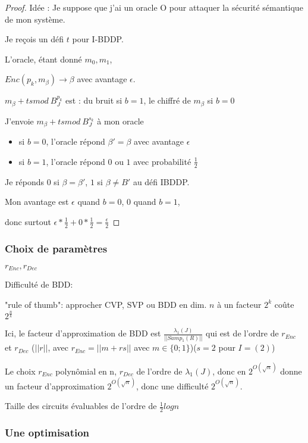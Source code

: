 \begin{proof}
Idée : Je suppose que j'ai un oracle O pour attaquer la sécurité sémantique de mon système.

Je reçois un défi $t$ pour I-BDDP.

L'oracle, étant donné $m_0, m_1$,

$Enc(p_k, m_{\beta}) \rightarrow \beta$ avec avantage $\epsilon$.


$m_{\beta}+t s mod \ B_J^{p_k}$ est : du bruit si $b=1$, le chiffré de $m_{\beta}$ si $b=0$

J'envoie $m_{\beta}+ t s mod \ B_J^{s_k}$ à mon oracle

\begin{itemize}
\item si $b=0$, l'oracle répond $\beta'=\beta$ avec avantage $\epsilon$
\item si $b=1$, l'oracle répond $0$ ou $1$ avec probabilité $\frac{1}{2}$
\end{itemize}

Je réponds $0$ si $\beta = \beta'$, $1$ si $\beta \neq B'$ au défi IBDDP.

Mon avantage est $\epsilon$ quand $b=0$, $0$ quand $b=1$,

donc surtout $\epsilon * \frac{1}{2}+ 0* \frac{1}{2}= \frac{\epsilon}{2}$

\end{proof}

\subsubsection{Choix de paramètres}

$r_{Enc}, r_{Dec}$

Difficulté de BDD:

"rule of thumb": approcher CVP, SVP ou BDD en dim. $n$ à un facteur $2^k$ coûte $2^{\frac{n}{k}}$

Ici, le facteur d'approximation de BDD est $\frac{\lambda_1(J)}{||Samp_1(R)||}$ qui est de l'ordre de $r_{Enc}$ et $r_{Dec}$ ($||r||$, avec $r_{Enc}=||m+r s||$ avec $m \in \{0 ; 1 \}$)($s=2$ pour $I=(2)$)

Le choix $r_{Enc}$ polynômial en n, $r_{Dec}$ de l'ordre de $\lambda_1(J)$, donc en $2^{O(\sqrt{n})}$ donne un facteur d'approximation $2^{O(\sqrt{n})}$, donc une difficulté $2^{O(\sqrt{n})}$.

Taille des circuits évaluables de l'ordre de $\frac{1}{2} log n$

\subsubsection{Une optimisation}

